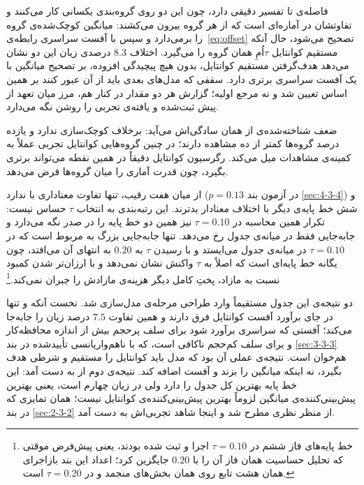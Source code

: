 فاصله‌ی  تا  تفسیر دقیقی دارد، چون این دو روی گروه‌بندی یکسانی کار
می‌کنند و تفاوتشان در آماره‌ای است که از هر گروه بیرون می‌کشند:  میانگین
کوچک‌شده‌ی گروه را برمی‌دارد و سپس با آفست سراسری رابطه‌ی~\ref{eq:offset} تصحیح
می‌شود، حال آنکه  مستقیم کوانتایل $\tau$اُمِ همان گروه را می‌گیرد. اختلاف $8.3$
درصدی زیان این دو نشان می‌دهد هدف‌گرفتن مستقیم کوانتایل، بدون هیچ پیچیدگی افزوده، بر
تصحیح میانگین با یک آفست سراسری برتری دارد. سقفی که مدل‌های بعدی باید از آن عبور کنند بر
همین اساس  تعیین شد و نه مرجع اولیه؛ گزارش هر دو مقدار در کنار هم، مرز میان تعهد
از پیش ثبت‌شده و یافته‌ی تجربی را روشن نگه می‌دارد.

ضعف شناخته‌شده‌ی  از همان سادگی‌اش می‌آید: برخلاف  کوچک‌سازی ندارد و
یازده درصد گروه‌ها کمتر از ده مشاهده دارند؛ در چنین گروه‌هایی کوانتایل تجربی عملاً به
کمینه‌ی مشاهدات میل می‌کند. رگرسیون کوانتایل دقیقاً در همین نقطه می‌تواند برتری بگیرد،
چون قدرت آماری را میان گروه‌ها قرض می‌دهد.

از میان هفت رقیب، تنها  تفاوت معناداری با  ندارد ($p = 0.13$ در آزمون بند
\ref{sec:4-3-4}) و شش خط پایه‌ی دیگر با اختلاف معنادار بدترند. این رتبه‌بندی به انتخاب
$\tau$ حساس نیست: تکرار همین محاسبه در $\tau = 0.10$ نیز همین دو خط پایه را در صدر نگه
می‌دارد و جابه‌جایی فقط در میانه‌ی جدول رخ می‌دهد. تنها جابه‌جایی بزرگ به  مربوط
است که در $\tau = 0.10$ در میانه‌ی جدول می‌ایستد و با رسیدن $\tau$ به $0.20$ به انتهای
آن می‌افتد، چون یگانه خط پایه‌ای است که اصلاً به $\tau$ واکنش نشان نمی‌دهد و با
ارزان‌تر شدن کمبود نسبت به مازاد، پختِ کامل دیگر هزینه‌ی مازادش را جبران
نمی‌کند.\footnote{%
خط پایه‌های فاز ششم در $\tau=0.10$ اجرا و ثبت شده بودند، یعنی پیش‌فرض موقتی که تحلیل
حساسیت همان فاز آن را با $0.20$ جایگزین کرد؛ اعداد این بند بازاجرای همان هشت تابع روی
همان بخش‌های منجمد و در $\tau=0.20$ است.}

دو نتیجه‌ی این جدول مستقیماً وارد طراحی مرحله‌ی مدل‌سازی شد. نخست آنکه  و
 تنها در جای برآورد آفست کوانتایل فرق دارند و همین تفاوت $7.5$ درصد زیان را
جابه‌جا می‌کند؛ آفستی که سراسری برآورد شود برای سلف پرحجم بیش از اندازه محافظه‌کار و
برای سلف کم‌حجم ناکافی است، که با ناهم‌واریانسی تأییدشده در بند \ref{sec:3-3-3} هم‌خوان
است. نتیجه‌ی عملی آن بود که مدل باید کوانتایل را مستقیم و شرطی هدف بگیرد، نه اینکه
میانگین را بزند و آفست اضافه کند. نتیجه‌ی دوم از  به دست آمد: این خط پایه بهترین
 کل جدول را دارد ولی در زیان  چهارم است، یعنی بهترین
پیش‌بینی‌کننده‌ی میانگین لزوماً بهترین پیش‌بینی‌کننده‌ی کوانتایل نیست؛ همان تمایزی که در
بند \ref{sec:2-3-2} از منظر نظری مطرح شد و اینجا شاهد تجربی‌اش به دست آمد.

